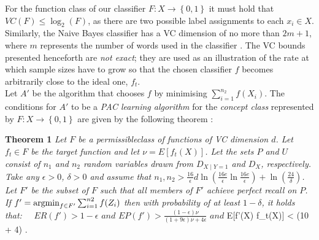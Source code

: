 \documentclass[12pt,twoside,notitlepage,amsart]{report} %
\begin{document}
	For the function class of our classifier $F: X \rightarrow \left\{ 0,1 \right\} $ it must hold that $VC(F) \leq \log_{2}(F)$, as there are two possible label assignments to each $x_i \in X$. Similarly, the Naive Bayes classifier has a VC dimension of no more than $2m+1$, where $m$ represents the number of words used in the classifier \cite{Liu02}. The VC bounds presented henceforth are \emph{not exact}; they are used as an illustration of the rate at which sample sizes have to grow so that the chosen classifier $f$ becomes arbitrarily close to the ideal one, $f_t$. \\
	
	Let $A'$ be the algorithm that chooses $f$ by minimising $\sum_{i=1}^{n_2}{f(X_i)}$. The conditions for $A'$ to be a \emph{PAC learning algorithm} for the \emph{concept class} represented by $F: X \rightarrow \left\{ 0,1 \right\}$ are given by the following theorem \cite{Liu02}: \\
	
	\newcommand{\argmin}{\operatornamewithlimits{argmin}}
	
	\textbf{Theorem 1}\emph{ Let $F$ be a permissible\footnotemark[1] class of functions of VC dimension $d$. Let $f_t \in F$ be the target function and let $\nu = E[f_t(X)]$.  Let the sets $P$ and $U$ consist of $n_1$ and $n_2$ random variables drawn from $D_{X \mid Y = 1}$ and $D_{X}$, respectively. Take any $\epsilon>0$, $\delta>0$ and assume that $n_1, n_2 > \frac{16}{\epsilon} d \ln( \frac{16e}{\epsilon} \ln \frac{16e}{\epsilon}) + \ln(\frac{24}{\delta} )$. Let $F'$ be the subset of $F$ such that all members of $F'$ achieve perfect recall on $P$. If $ f' = \argmin_{f \in F'}\sum_{i=1}^{n2}{f(Z_i)}$ then with probability of at least $1 - \delta$, it holds that: }
	$\phantom{aa} ER(f') > 1 - \epsilon \textit{ and } EP(f') >  \frac{(1 - \epsilon) \nu}{(1+9\epsilon) \nu + 4 \epsilon} \textit{ and } $E[f'(X) \neq f_t(X)] < (10 \nu + 4) \epsilon$. $ 
	
\end{document}

